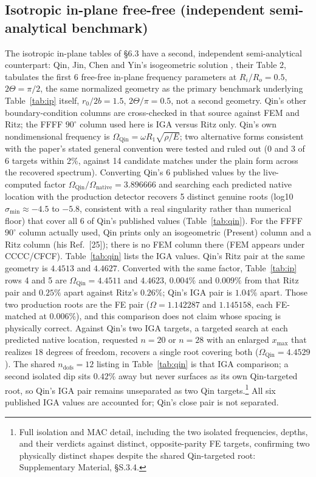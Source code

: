 \documentclass[11pt]{article}
\begin{document}
\subsection{Isotropic in-plane free-free (independent semi-analytical
benchmark)}\label{sec:qin}
The isotropic in-plane tables of \S6.3 have a second, independent
semi-analytical counterpart: Qin, Jin, Chen and Yin's isogeometric
solution \cite{qin2018}, their Table 2, tabulates the first 6 free-free
in-plane frequency parameters at $R_i/R_o=0.5$, $2\Theta=\pi/2$, the
same normalized geometry as the primary benchmark
underlying Table~\ref{tab:ip} itself, $r_0/2b=1.5$, $2\Theta/\pi=0.5$, not
a second geometry. Qin's other boundary-condition columns are
cross-checked in that source against FEM and Ritz; the FFFF $90^\circ$
column used here is IGA versus Ritz only.
Qin's own nondimensional frequency is
$\Omega_{\mathrm{Qin}}=\omega R_1\sqrt{\rho/E}$; two alternative forms
consistent with the paper's stated general convention were tested and
ruled out (0 and 3 of 6 targets within 2\%, against 14 candidate matches
under the plain form across the recovered spectrum). Converting Qin's 6
published values by the live-computed factor
$\Omega_{\mathrm{Qin}}/\Omega_{\mathrm{native}}=3.896666$ and searching
each predicted native location with the production detector recovers 5
distinct genuine roots (log10 $\sigma_{\min}\approx-4.5$ to $-5.8$,
consistent with a real singularity rather than numerical floor) that
cover all 6 of Qin's published values (Table~\ref{tab:qin}). For the
FFFF $90^\circ$ column actually used, Qin prints only an isogeometric
(Present) column and a Ritz column (his Ref.~[25]); there is no FEM
column there (FEM appears under CCCC/CFCF). Table~\ref{tab:qin} lists
the IGA values. Qin's Ritz pair at the same geometry is $4.4513$ and
$4.4627$. Converted with the same factor, Table~\ref{tab:ip} rows 4 and 5
are $\Omega_{\mathrm{Qin}}=4.4511$ and $4.4623$, $0.004\%$ and $0.009\%$
from that Ritz pair and $0.25\%$ apart against Ritz's $0.26\%$; Qin's IGA pair is
$1.04\%$ apart. Those two production roots are the FE pair
($\Omega=1.142287$ and $1.145158$, each FE-matched at $0.006\%$), and
this comparison does not claim whose spacing is physically correct.
Against Qin's two IGA targets, a targeted search at each predicted native
location, requested $n{=}20$ or $n{=}28$ with an enlarged $x_{\max}$
that realizes 18 degrees of freedom, recovers a single root covering
both ($\Omega_{\mathrm{Qin}}=4.4529$). The shared $n_{\mathrm{dofs}}=12$
listing in Table~\ref{tab:qin} is that IGA comparison; a second isolated
dip sits $0.42\%$ away but never surfaces as its own Qin-targeted
root, so Qin's IGA pair remains unseparated as two Qin targets.\footnote{Full isolation and MAC detail,
including the two isolated frequencies, depths, and their verdicts
against distinct, opposite-parity FE targets, confirming two physically
distinct shapes despite the shared Qin-targeted root: Supplementary
Material, §S.3.4.} All six published IGA values
are accounted for; Qin's close pair is not separated.
\end{document}
